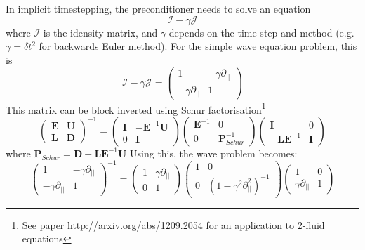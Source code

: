 \documentclass[12pt]{article}
\newcommand{\bb}[1]{\mathbf{#1}}
\begin{document}
In implicit timestepping, the preconditioner needs to solve an equation
\[
\mathcal{I} - \gamma \mathcal{J}
\]
where $\mathcal{I}$ is the idensity matrix, and $\gamma$ depends on the time step and method (e.g. $\gamma = \delta t^2$ for backwards Euler method). For the simple wave equation problem, this is
\[
\mathcal{I} - \gamma \mathcal{J} = \left(\begin{array}{cc}
1 & -\gamma\partial_{||} \\
-\gamma\partial_{||} & 1
\end{array}\right)
\]
This matrix can be block inverted using Schur factorisation\footnote{See paper \url{http://arxiv.org/abs/1209.2054} for an application to 2-fluid equations}
\[
\left(\begin{array}{cc}
  \bb{E} & \bb{U} \\
  \bb{L} & \bb{D}
\end{array}\right)^{-1} =
\left(\begin{array}{cc}
  \bb{I} & -\bb{E}^{-1}\bb{U} \\
  0 & \bb{I}
\end{array}\right)\left(\begin{array}{cc}
  \bb{E}^{-1} & 0 \\
  0 & \bb{P}_{Schur}^{-1}
\end{array}\right)\left(\begin{array}{cc}
  \bb{I} & 0 \\
  -\bb{L}\bb{E}^{-1} & \bb{I}
\end{array}\right)
\]
where $\bb{P}_{Schur} = \bb{D} - \bb{L}\bb{E}^{-1}\bb{U}$
Using this, the wave problem becomes:
\begin{equation}
\left(\begin{array}{cc}
1 & -\gamma\partial_{||} \\
-\gamma\partial_{||} & 1
\end{array}\right)^{-1} = \left(\begin{array}{cc}
1 & \gamma\partial_{||} \\
0 & 1
\end{array}\right)\left(\begin{array}{cc}
1 & 0 \\
0 & \left(1 - \gamma^2\partial^2_{||}\right)^{-1}
\end{array}\right)\left(\begin{array}{cc}
1 & 0 \\
\gamma\partial_{||} & 1
\end{array}\right)
\label{eq:precon}
\end{equation}
\end{document}
